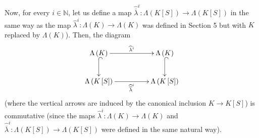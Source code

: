 \documentclass[12pt,final,notitlepage,onecolumn,german]{article}%
\begin{document}
Now, for every $i\in\mathbb{N}$, let us define a map $\widehat{\overline
{\lambda}}^{i}:\Lambda\left(  K\left[  S\right]  \right)  \rightarrow
\Lambda\left(  K\left[  S\right]  \right)  $ in the same way as the map
$\widehat{\lambda}^{i}:\Lambda\left(  K\right)  \rightarrow\Lambda\left(
K\right)  $ was defined in Section 5 but with $K$ replaced by $\Lambda\left(
K\right)  $). Then, the diagram%
\begin{equation}
\xymatrixcolsep{4pc}\xymatrix{ \Lambda\left(K\right) \ar@{^{(}->}[d] \ar[r]^{\widehat{\lambda}^i} & \Lambda\left(K\right) \ar@{^{(}->}[d] \\ \Lambda\left(K\left[S\right]\right) \ar[r]_{\widehat{\overline{\lambda}}^i} & \Lambda\left(K\left[S\right]\right) }
\label{7.3.commdiag}%
\end{equation}
(where the vertical arrows are induced by the canonical inclusion
$K\rightarrow K\left[  S\right]  $) is commutative (since the maps
$\widehat{\lambda}^{i}:\Lambda\left(  K\right)  \rightarrow\Lambda\left(
K\right)  $ and $\widehat{\overline{\lambda}}^{i}:\Lambda\left(  K\left[
S\right]  \right)  \rightarrow\Lambda\left(  K\left[  S\right]  \right)  $
were defined in the same natural way).
\end{document}
